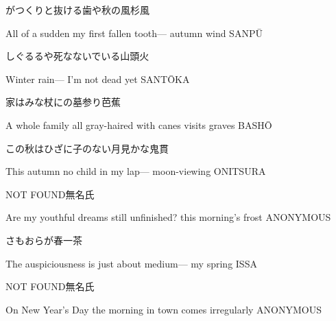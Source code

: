 \begin{haiku}
    {\FH がつくりと抜ける歯や秋の風}\hfill{\FH 杉風}

    \vin{} All of a sudden
    \vin{} \vin{} my first fallen tooth---
    \vin{} \vin{} \vin{} autumn wind \hspace{\fill} SANP\={U}
\end{haiku}

\begin{haiku}
    {\FH しぐるるや死なないでいる}\hfill{\FH 山頭火}

    \vin{} Winter rain---
    \vin{} \vin{} I'm not dead yet \hspace{\fill} SANT\={O}KA
\end{haiku}

\begin{haiku}
    {\FH 家はみな杖にの墓参り}\hfill{\FH 芭蕉}

    \vin{} A whole family
    \vin{} \vin{} all gray-haired with canes
    \vin{} \vin{} \vin{} visits graves \hspace{\fill} BASH\={O}
\end{haiku}

\begin{haiku}
    {\FH この秋はひざに子のない月見かな}\hfill{\FH 鬼貫}

    \vin{} This autumn
    \vin{} \vin{} no child in my lap---
    \vin{} \vin{} \vin{} moon-viewing \hspace{\fill} ONITSURA
\end{haiku}

\begin{haiku}
    NOT FOUND\hfill{\FH 無名氏}

    \vin{} Are my youthful dreams
    \vin{} \vin{} still unfinished?
    \vin{} \vin{} \vin{} this morning's frost \hspace{\fill} ANONYMOUS
\end{haiku}

\begin{haiku}
    {\FH {}さもおらが春}\hfill{\FH 一茶}

    \vin{} The auspiciousness
    \vin{} \vin{} is just about medium---
    \vin{} \vin{} \vin{} my spring \hspace{\fill} ISSA
\end{haiku}

\begin{haiku}
    NOT FOUND\hfill{\FH 無名氏}

    \vin{} On New Year's Day
    \vin{} \vin{} the morning in town
    \vin{} \vin{} \vin{} comes irregularly \hspace{\fill} ANONYMOUS
\end{haiku}

